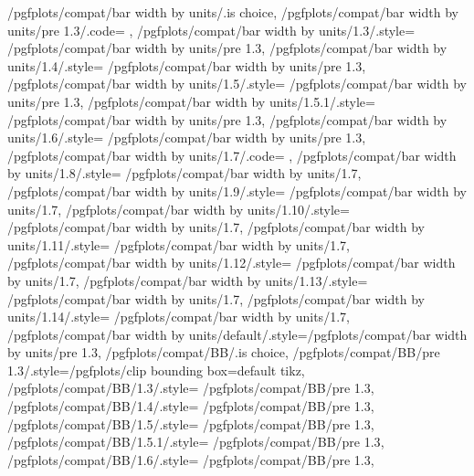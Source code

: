 {	%
	/pgfplots/compat/bar width by units/.is choice,
	/pgfplots/compat/bar width by units/pre 1.3/.code=	{\def\b@pgfplots@compat@bar@width@units{1}},%
	/pgfplots/compat/bar width by units/1.3/.style=	{/pgfplots/compat/bar width by units/pre 1.3},
	/pgfplots/compat/bar width by units/1.4/.style=	{/pgfplots/compat/bar width by units/pre 1.3},%
	/pgfplots/compat/bar width by units/1.5/.style=	{/pgfplots/compat/bar width by units/pre 1.3},%
	/pgfplots/compat/bar width by units/1.5.1/.style=	{/pgfplots/compat/bar width by units/pre 1.3},%
	/pgfplots/compat/bar width by units/1.6/.style=	{/pgfplots/compat/bar width by units/pre 1.3},%
	/pgfplots/compat/bar width by units/1.7/.code=		{\def\b@pgfplots@compat@bar@width@units{0}},%
	/pgfplots/compat/bar width by units/1.8/.style=		{/pgfplots/compat/bar width by units/1.7},
	/pgfplots/compat/bar width by units/1.9/.style=		{/pgfplots/compat/bar width by units/1.7},
	/pgfplots/compat/bar width by units/1.10/.style=		{/pgfplots/compat/bar width by units/1.7},
	/pgfplots/compat/bar width by units/1.11/.style=		{/pgfplots/compat/bar width by units/1.7},
	/pgfplots/compat/bar width by units/1.12/.style=		{/pgfplots/compat/bar width by units/1.7},
	/pgfplots/compat/bar width by units/1.13/.style=		{/pgfplots/compat/bar width by units/1.7},
	/pgfplots/compat/bar width by units/1.14/.style=		{/pgfplots/compat/bar width by units/1.7},
	/pgfplots/compat/bar width by units/default/.style={/pgfplots/compat/bar width by units/pre 1.3},
	/pgfplots/compat/BB/.is choice,
	/pgfplots/compat/BB/pre 1.3/.style={/pgfplots/clip bounding box=default tikz},%
	/pgfplots/compat/BB/1.3/.style=	{/pgfplots/compat/BB/pre 1.3},
	/pgfplots/compat/BB/1.4/.style=	{/pgfplots/compat/BB/pre 1.3},%
	/pgfplots/compat/BB/1.5/.style=	{/pgfplots/compat/BB/pre 1.3},%
	/pgfplots/compat/BB/1.5.1/.style=	{/pgfplots/compat/BB/pre 1.3},%
	/pgfplots/compat/BB/1.6/.style=	{/pgfplots/compat/BB/pre 1.3},%
}
